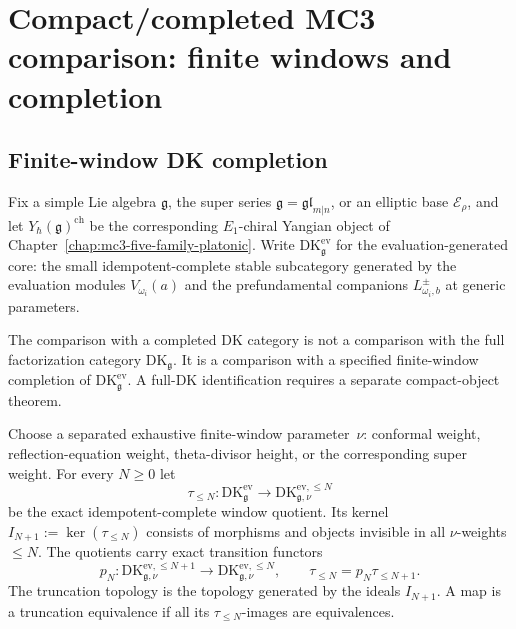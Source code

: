 \chapter{Compact/completed MC3 comparison: finite windows and completion}
\label{chap:compact-completed-mc3-comparison-platonic}

\providecommand{\ClaimStatusProvedHere}{\textsc{ProvedHere}}
\providecommand{\ClaimStatusProvedElsewhere}{\textsc{ProvedElsewhere}}
\providecommand{\ClaimStatusConjectured}{\textsc{Conjectured}}
\providecommand{\ClaimStatusHeuristic}{\textsc{Heuristic}}
\providecommand{\SpCh}{\mathrm{Sp}^{\mathrm{ch}}}
\providecommand{\PhiFA}{\Phi^{\mathrm{FA}}}

\section{Finite-window DK completion}
\label{sec:compact-completed-mc3-setup}

Fix a simple Lie algebra $\mathfrak{g}$, the super series
$\mathfrak{g}=\mathfrak{gl}_{m|n}$, or an elliptic base
$\mathcal E_\rho$, and let
$Y_\hbar(\mathfrak g)^{\mathrm{ch}}$ be the corresponding
$E_1$-chiral Yangian object of
Chapter~\ref{chap:mc3-five-family-platonic}.  Write
$\mathrm{DK}^{\mathrm{ev}}_{\mathfrak g}$ for the
evaluation-generated core: the small idempotent-complete stable
subcategory generated by the evaluation modules
$V_{\omega_i}(a)$ and the prefundamental companions
$L^\pm_{\omega_i,b}$ at generic parameters.

The comparison with a completed DK category is not a comparison with
the full factorization category $\mathrm{DK}_{\mathfrak g}$.  It is a
comparison with a specified finite-window completion of
$\mathrm{DK}^{\mathrm{ev}}_{\mathfrak g}$.  A full-DK identification
requires a separate compact-object theorem.

\begin{definition}
\label{def:truncation-topology-mc3}
%
%
Choose a separated exhaustive finite-window parameter~$\nu$:
conformal weight, reflection-equation weight, theta-divisor height,
or the corresponding super weight.  For every $N\geq0$ let
\[
 \tau_{\le N}\colon
 \mathrm{DK}^{\mathrm{ev}}_{\mathfrak g}
 \longrightarrow
 \mathrm{DK}^{\mathrm{ev},\le N}_{\mathfrak g,\nu}
\]
be the exact idempotent-complete window quotient.  Its kernel
$I_{N+1}:=\ker(\tau_{\le N})$ consists of morphisms and objects
invisible in all $\nu$-weights $\le N$.  The quotients carry exact
transition functors
\[
 p_N\colon
 \mathrm{DK}^{\mathrm{ev},\le N+1}_{\mathfrak g,\nu}
 \longrightarrow
 \mathrm{DK}^{\mathrm{ev},\le N}_{\mathfrak g,\nu},
 \qquad
 \tau_{\le N}=p_N\tau_{\le N+1}.
\]
The truncation topology is the topology generated by the ideals
$I_{N+1}$.  A map is a truncation equivalence if all its
$\tau_{\le N}$-images are equivalences.
\end{definition}

